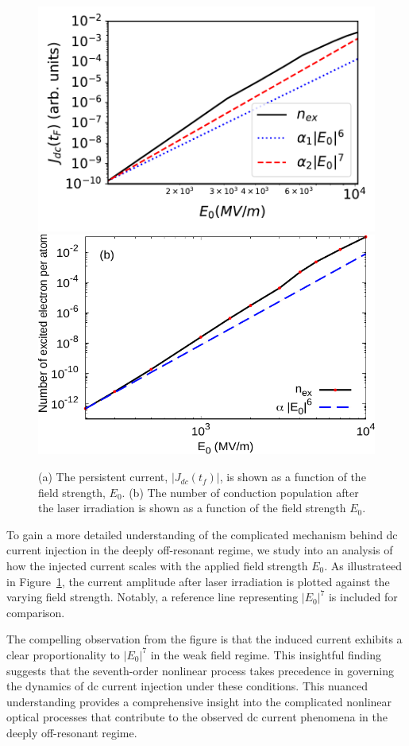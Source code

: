 \begin{figure}[htbp]
\centering
\includegraphics[width=0.85\linewidth]{pic/dc_current_vs_E0.pdf}
\includegraphics[width=0.78\linewidth]{pic/nex_vs_E0.pdf}
\caption{\label{fig:dc_current_vs_E0} 
(a) The persistent current, $|J_{dc}(t_f)|$, is shown as a function of the field strength, $E_0$. (b) The number of conduction population after the laser irradiation is shown as a function of the field strength $E_0$.
}
\end{figure}
To gain a more detailed understanding of the complicated mechanism behind dc current injection in the deeply off-resonant regime, we study into an analysis of how the injected current scales with the applied field strength $E_0$. As illustrateed in Figure~\ref{fig:dc_current_vs_E0}, the current amplitude after laser irradiation is plotted against the varying field strength. Notably, a reference line representing $|E_0|^7$ is included for comparison.

The compelling observation from the figure is that the induced current exhibits a clear proportionality to $|E_0|^7$ in the weak field regime. This insightful finding suggests that the seventh-order nonlinear process takes precedence in governing the dynamics of dc current injection under these conditions. This nuanced understanding provides a comprehensive insight into the complicated nonlinear optical processes that contribute to the observed dc current phenomena in the deeply off-resonant regime.

